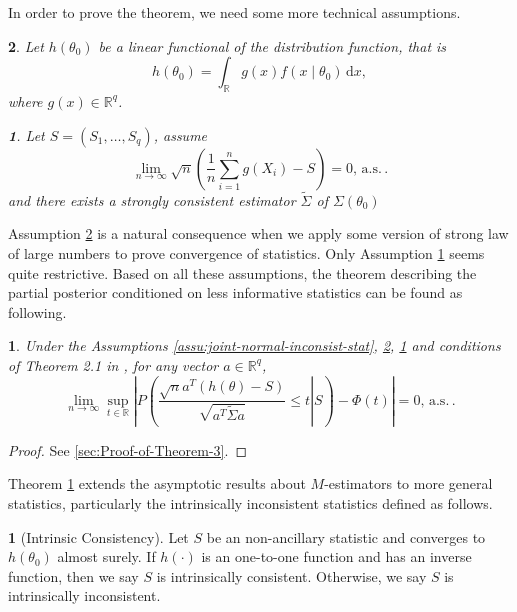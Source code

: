 \documentclass[oneside,english]{amsbook}
\numberwithin{section}{chapter}
\numberwithin{equation}{section}
\numberwithin{figure}{section}
\theoremstyle{plain}
\theoremstyle{plain}
\newtheorem{assumption}{\protect\assumptionname}
\theoremstyle{definition}
\newtheorem{defn}{\protect\definitionname}
\theoremstyle{plain}
\newtheorem{thm}{\protect\theoremname}
\theoremstyle{plain}
\theoremstyle{remark}
\theoremstyle{definition}
\theoremstyle{definition}
\newcommand{\diff}{\,\mathrm{d}}
\newcommand{\ascv}{\,\mathrm{a.s.}\,}
\providecommand{\assumptionname}{Assumption}
\providecommand{\definitionname}{Definition}
\providecommand{\theoremname}{Theorem}
\begin{document}
In order to prove the theorem, we need some more technical assumptions.
\begin{assumption}
\label{assu:consist-linear-functional}Let $h\left(\theta_{0}\right)$
be a linear functional of the distribution function, that is 
\[
h\left(\theta_{0}\right)=\int_{\mathbb{R}}g\left(x\right)f\left(x\mid\theta_{0}\right)\diff x,
\]
where $g\left(x\right)\in\mathbb{R}^{q}$. 
\begin{assumption}
\label{assu:super-strong-consistent}Let $S=\left(S_{1},\ldots,S_{q}\right)$,
assume 
\[
\lim_{n\rightarrow\infty}\sqrt{n}\left(\frac{1}{n}\sum_{i=1}^{n}g\left(X_{i}\right)-S\right)=0,\ascv.
\]
and there exists a strongly consistent estimator $\tilde{\Sigma}$
of $\Sigma\left(\theta_{0}\right)$
\end{assumption}
\end{assumption}
Assumption \ref{assu:consist-linear-functional} is a natural consequence
when we apply some version of strong law of large numbers to prove
convergence of statistics. Only Assumption \ref{assu:super-strong-consistent}
seems quite restrictive. Based on all these assumptions, the theorem
describing the partial posterior conditioned on less informative statistics
can be found as following.
\begin{thm}
\label{thm:bernsten-von-mise-inconsist-multv}Under the Assumptions
\ref{assu:joint-normal-inconsist-stat}, \ref{assu:consist-linear-functional},
\ref{assu:super-strong-consistent} and conditions of Theorem 2.1
in \citet{rivoirard2012bernstein}, for any vector $a\in\mathbb{R}^{q}$,
\[
\lim_{n\rightarrow\infty}\sup_{t\in\mathbb{R}}\left|P\left(\left.\frac{\sqrt{n}a^{T}\left(h\left(\theta\right)-S\right)}{\sqrt{a^{T}\tilde{\Sigma}a}}\le t\right|S\right)-\Phi\left(t\right)\right|=0,\ascv.
\]
\end{thm}
\begin{proof}
See \ref{sec:Proof-of-Theorem-3}.
\end{proof}
Theorem \ref{thm:bernsten-von-mise-inconsist-multv} extends the asymptotic
results about $M$-estimators to more general statistics, particularly
the intrinsically inconsistent statistics defined as follows.
\begin{defn}[Intrinsic Consistency]
Let $S$ be an non-ancillary statistic and converges to $h\left(\theta_{0}\right)$
almost surely. If $h\left(\cdot\right)$ is an one-to-one function
and has an inverse function, then we say $S$ is intrinsically consistent.
Otherwise, we say $S$ is intrinsically inconsistent. 
\end{defn}
\end{document}
